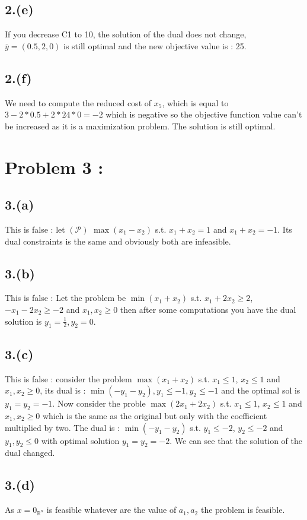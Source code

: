 \documentclass{article}
\begin{document}
\subsection*{2.(e)}
If you decrease C1 to 10, the solution of the dual does not change, $\overline{y} = (0.5,2,0)$ is still optimal and the new objective value is : 25.
\subsection*{2.(f)}
We need to compute the reduced cost of $x_5$, which is equal to $3-2*0.5+2*2 4*0 = -2$ which is negative so the objective function value can't be increased as it is a maximization problem.
The solution is still optimal.
\section*{Problem 3 :}
\subsection*{3.(a)}
This is false : let $(\mathcal{P})$ $\max(x_1-x_2)$ s.t. $x_1+x_2 = 1$ and $x_1+x_2 = -1$. Its dual constraints is the same and obviously both are infeasible.
\subsection*{3.(b)}
This is false : Let the problem be $\min(x_1+x_2)$ s.t. $x_1+2x_2\ge 2$, $-x_1-2x_2\ge -2$ and $x_1,x_2\ge 0$ then after some computations you have the dual solution is $y_1 = \frac{1}{2}, y_2 = 0$.
\subsection*{3.(c)}
This is false : consider the problem $\max(x_1+x_2)$ s.t. $x_1 \leq 1$, $x_2\leq 1$ and $x_1,x_2\ge 0$, its dual is : $\min(-y_1-y_2), y_1\leq -1, y_2 \leq -1$ and the optimal sol is $y_1 = y_2 = -1$.
Now consider the proble $\max(2x_1+2x_2)$ s.t. $x_1 \leq 1$, $x_2\leq 1$ and $x_1,x_2\ge 0$ which is the same as the original but only with the coefficient multiplied by two. The dual is : $\min(-y_1-y_2)$ s.t. $y_1\leq -2$, $y_2\leq -2$ and $y_1,y_2\leq 0$ with optimal solution $y_1=y_2=-2$.
We can see that the solution of the dual changed.
\subsection*{3.(d)}
As $x=0_{\mathbb{R}^n}$ is feasible whatever are the value of $a_1,a_2$ the problem is feasible.
\end{document}
